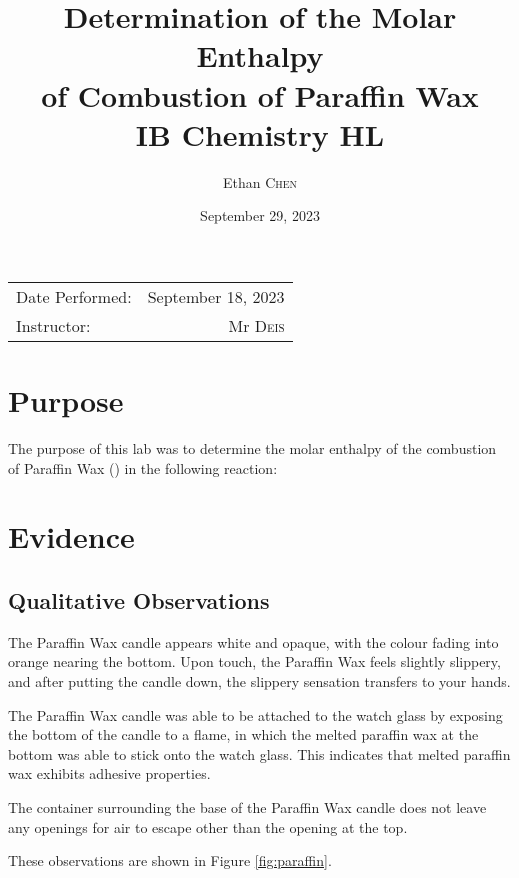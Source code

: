 \documentclass[
	letterpaper, %
	12pt, %
]{CSUniSchoolLabReport}
\title{Determination of the Molar Enthalpy \\ of Combustion of Paraffin Wax \\ IB Chemistry HL} %
\author{Ethan \textsc{Chen}} %
\date{September 29, 2023} %
\begin{document}
\maketitle %

\begin{center}
  \begin{tabular}{l r}
    Date Performed: & September 18, 2023 \\ %
    Instructor:     & Mr \textsc{Deis}   %
  \end{tabular}
\end{center}



\section{Purpose}

\par The purpose of this lab was to determine the molar enthalpy of the combustion of Paraffin Wax () in the following reaction:

\begin{center}
\end{center}


\section{Evidence}

\subsection{Qualitative Observations}

The Paraffin Wax candle appears white and opaque, with the colour fading into orange nearing the bottom.
Upon touch, the Paraffin Wax feels slightly slippery, and after putting the candle down, the slippery sensation
transfers to your hands.
\\
\par The Paraffin Wax candle was able to be attached to the watch glass by exposing the
bottom of the candle to a flame, in which the melted paraffin wax at the bottom
was able to stick onto the watch glass. This indicates that melted paraffin wax exhibits
adhesive properties.
\\
\par The container surrounding the base of the Paraffin Wax candle does not leave
any openings for air to escape other than the opening at the top.
\\
\par These observations are shown in Figure \ref*{fig:paraffin}.
\end{document}
